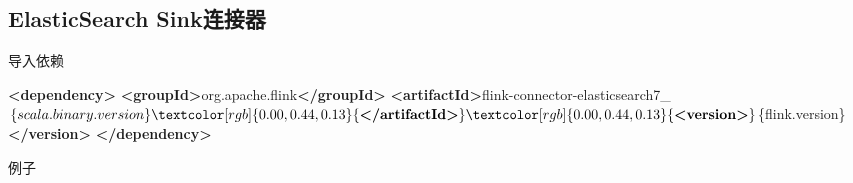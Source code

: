 \documentclass[cn,11pt,chinese]{elegantbook}
\newenvironment{Shaded}{}{}
\newcommand{\KeywordTok}[1]{\textcolor[rgb]{0.00,0.44,0.13}{\textbf{#1}}}
\newcommand{\NormalTok}[1]{#1}
\begin{document}
\hypertarget{elasticsearch-sinkux8fdeux63a5ux5668}{%
\subsection{ElasticSearch
Sink连接器}\label{elasticsearch-sinkux8fdeux63a5ux5668}}

导入依赖

\begin{Shaded}
\begin{Highlighting}[]
\KeywordTok{\textless{}dependency\textgreater{}}
  \KeywordTok{\textless{}groupId\textgreater{}}\NormalTok{org.apache.flink}\KeywordTok{\textless{}/groupId\textgreater{}}
  \KeywordTok{\textless{}artifactId\textgreater{}}\NormalTok{flink{-}connector{-}elasticsearch7\_$\{scala.binary.version\}}\KeywordTok{\textless{}/artifactId\textgreater{}}
  \KeywordTok{\textless{}version\textgreater{}}\NormalTok{$\{flink.version\}}\KeywordTok{\textless{}/version\textgreater{}}
\KeywordTok{\textless{}/dependency\textgreater{}}
\end{Highlighting}
\end{Shaded}

例子
\end{document}
